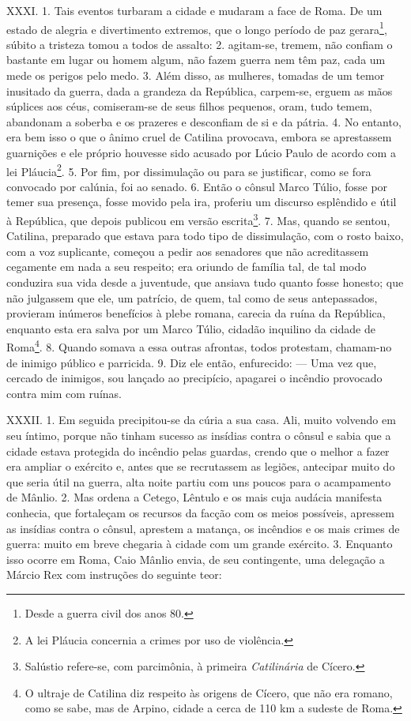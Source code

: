 XXXI. 1. Tais eventos turbaram a cidade e mudaram a face de Roma. De um estado
de alegria e divertimento extremos, que o longo período de paz
gerara\footnote{Desde a guerra civil dos anos 80.}, súbito a tristeza tomou a
todos de assalto: 2. agitam-se, tremem, não confiam o bastante em lugar ou
homem algum, não fazem guerra nem têm paz, cada um mede os perigos pelo medo.
3. Além disso, as mulheres, tomadas de um temor inusitado da guerra, dada a
grandeza da República, carpem-se, erguem as mãos súplices aos céus,
comiseram-se de seus filhos pequenos, oram, tudo temem, abandonam a soberba e
os prazeres e desconfiam de si e da pátria. 4. No entanto, era bem isso o que o
ânimo cruel de Catilina provocava, embora se aprestassem guarnições e ele
próprio houvesse sido acusado por Lúcio Paulo de acordo com a lei
Pláucia\footnote{A lei Pláucia concernia a crimes por uso de violência.}. 5.
Por fim, por dissimulação ou para se justificar, como se fora convocado por
calúnia, foi ao senado. 6. Então o cônsul Marco Túlio, fosse por temer sua
presença, fosse movido pela ira, proferiu um discurso esplêndido e útil à
República, que depois publicou em versão escrita\footnote{Salústio refere-se,
com parcimônia, à primeira \emph{Catilinária} de Cícero.}. 7. Mas, quando se
sentou, Catilina, preparado que estava para todo tipo de dissimulação, com o
rosto baixo, com a voz suplicante, começou a pedir aos senadores que não
acreditassem cegamente em nada a seu respeito; era oriundo de família tal, de
tal modo conduzira sua vida desde a juventude, que ansiava tudo quanto fosse
honesto; que não julgassem que ele, um patrício, de quem, tal como de seus
antepassados, provieram inúmeros benefícios à plebe romana, carecia da ruína da
República, enquanto esta era salva por um Marco Túlio, cidadão inquilino da
cidade de Roma\footnote{O ultraje de Catilina diz respeito às origens de
Cícero, que não era romano, como se sabe, mas de Arpino, cidade a cerca de 110
km a sudeste de Roma.}. 8. Quando somava a essa outras afrontas, todos
protestam, chamam-no de inimigo público e parricida. 9. Diz ele então,
enfurecido: --- Uma vez que, cercado de inimigos, sou lançado ao precipício,
apagarei o incêndio provocado contra mim com ruínas.

XXXII. 1. Em seguida precipitou-se da cúria a sua casa. Ali, muito volvendo em
seu íntimo, porque não tinham sucesso as insídias contra o cônsul e sabia que a
cidade estava protegida do incêndio pelas guardas, crendo que o melhor a fazer
era ampliar o exército e, antes que se recrutassem as legiões, antecipar muito
do que seria útil na guerra, alta noite partiu com uns poucos para o
acampamento de Mânlio. 2. Mas ordena a Cetego, Lêntulo e os mais cuja audácia
manifesta conhecia, que fortaleçam os recursos da facção com os meios
possíveis, apressem as insídias contra o cônsul, aprestem a matança, os
incêndios e os mais crimes de guerra: muito em breve chegaria à cidade com um
grande exército. 3. Enquanto isso ocorre em Roma, Caio Mânlio envia, de seu contingente, uma delegação  a Márcio
Rex com instruções do seguinte teor:


